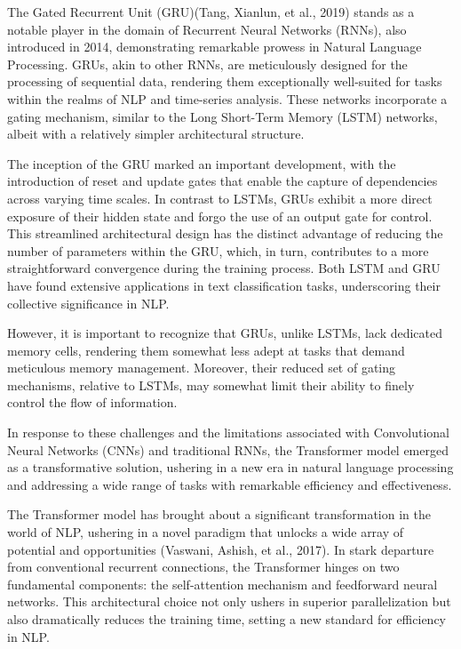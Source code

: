 \documentclass[fleqn,10pt]{thescipub} %
\begin{document}
The Gated Recurrent Unit (GRU)(Tang, Xianlun, et al., 2019) stands as a notable player in the domain of Recurrent Neural Networks (RNNs), also introduced in 2014, demonstrating remarkable prowess in Natural Language Processing. GRUs, akin to other RNNs, are meticulously designed for the processing of sequential data, rendering them exceptionally well-suited for tasks within the realms of NLP and time-series analysis. These networks incorporate a gating mechanism, similar to the Long Short-Term Memory (LSTM) networks, albeit with a relatively simpler architectural structure.


The inception of the GRU marked an important development, with the introduction of reset and update gates that enable the capture of dependencies across varying time scales. In contrast to LSTMs, GRUs exhibit a more direct exposure of their hidden state and forgo the use of an output gate for control. This streamlined architectural design has the distinct advantage of reducing the number of parameters within the GRU, which, in turn, contributes to a more straightforward convergence during the training process. Both LSTM and GRU have found extensive applications in text classification tasks, underscoring their collective significance in NLP.


However, it is important to recognize that GRUs, unlike LSTMs, lack dedicated memory cells, rendering them somewhat less adept at tasks that demand meticulous memory management. Moreover, their reduced set of gating mechanisms, relative to LSTMs, may somewhat limit their ability to finely control the flow of information. 

In response to these challenges and the limitations associated with Convolutional Neural Networks (CNNs) and traditional RNNs, the Transformer model emerged as a transformative solution, ushering in a new era in natural language processing and addressing a wide range of tasks with remarkable efficiency and effectiveness.

The Transformer model has brought about a significant transformation in the world of NLP, ushering in a novel paradigm that unlocks a wide array of potential and opportunities (Vaswani, Ashish, et al., 2017). In stark departure from conventional recurrent connections, the Transformer hinges on two fundamental components: the self-attention mechanism and feedforward neural networks. This architectural choice not only ushers in superior parallelization but also dramatically reduces the training time, setting a new standard for efficiency in NLP.
\end{document}
